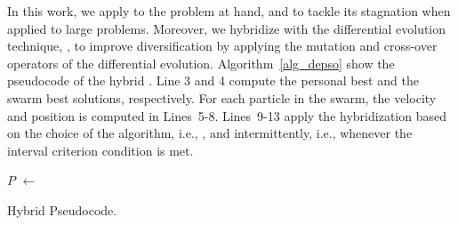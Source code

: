 In this work, we apply \hcpso{} to the problem at hand, and to tackle its stagnation when applied to large problems. Moreover, we hybridize \pso{} with the differential evolution technique, \depso{}, to improve diversification by applying the mutation and cross-over operators of the differential evolution. Algorithm~\ref{alg_depso} show the pseudocode of the hybrid \pso{}. Line 3 and 4 compute the personal best and the swarm best solutions, respectively. For each particle in the swarm, the velocity and position is computed in Lines~5-8. Lines~9-13 apply the hybridization based on the choice of the algorithm, i.e., \de, \hcpso{} and \shpso{} intermittently, i.e., whenever the interval criterion condition is met.
\IncMargin{1em}
\begin{algorithm}[H]
	\SetAlgoLined
	
	\BlankLine
	\BlankLine
	\Particles $P$ $\leftarrow$ \InitPSO{}\;
	\BlankLine
	\caption{Hybrid \pso{} Pseudocode.}
	\label{alg_depso}
\end{algorithm}\DecMargin{1em}

